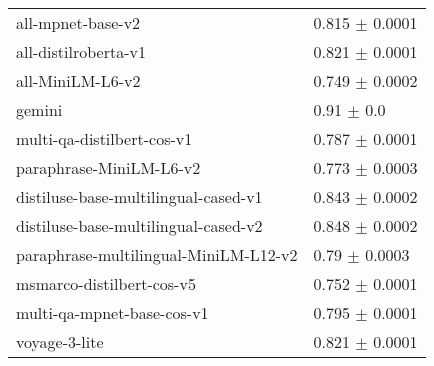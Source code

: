 \begin{table}[h!]
{\begin{tabular}{ll}
                all-mpnet-base-v2 &      0.815 $\pm$ 0.0001 \\
                 all-distilroberta-v1 &                 0.821 $\pm$ 0.0001 \\
                     all-MiniLM-L6-v2 &                 0.749 $\pm$ 0.0002 \\
                               gemini &                     0.91 $\pm$ 0.0 \\
           multi-qa-distilbert-cos-v1 &                 0.787 $\pm$ 0.0001 \\
              paraphrase-MiniLM-L6-v2 &                 0.773 $\pm$ 0.0003 \\
 distiluse-base-multilingual-cased-v1 &                 0.843 $\pm$ 0.0002 \\
 distiluse-base-multilingual-cased-v2 &                 0.848 $\pm$ 0.0002 \\
paraphrase-multilingual-MiniLM-L12-v2 &                  0.79 $\pm$ 0.0003 \\
            msmarco-distilbert-cos-v5 &                 0.752 $\pm$ 0.0001 \\
           multi-qa-mpnet-base-cos-v1 &                 0.795 $\pm$ 0.0001 \\
                        voyage-3-lite &                 0.821 $\pm$ 0.0001 \\
                               

\end{tabular}}
\end{table}
